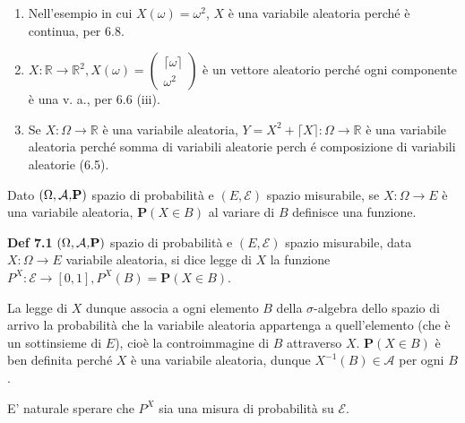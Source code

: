 \documentclass{article}
\begin{document}
\begin{enumerate}
\item Nell'esempio in cui $X\left( \omega \right) =\omega ^{2}$, $X$ \`{e}
una variabile aleatoria perch\'{e} \`{e} continua, per 6.8.

\item $X:%
\mathbb{R}
\mathcal{\rightarrow }%
\mathbb{R}
^{2},X\left( \omega \right) =\left( 
\begin{array}{c}
\lceil \omega \rceil \\ 
\omega ^{2}%
\end{array}%
\right) $ \`{e} un vettore aleatorio perch\'{e} ogni componente \`{e} una v.
a., per 6.6 (iii).

\item Se $X:\Omega \rightarrow 
\mathbb{R}
$ \`{e} una variabile aleatoria, $Y=X^{2}+\lceil X\rceil :\Omega \rightarrow 
\mathbb{R}
$ \`{e} una variabile aleatoria perch\'{e} somma di variabili aleatorie perch%
\'{e} composizione di variabili aleatorie (6.5).
\end{enumerate}

Dato $\left( \Omega ,\mathcal{A}\emph{,}\mathbf{P}\right) $ spazio di
probabilit\`{a} e $\left( E,\mathcal{E}\right) $ spazio misurabile, se $%
X:\Omega \rightarrow E$ \`{e} una variabile aleatoria, $\mathbf{P}\left(
X\in B\right) $ al variare di $B$ definisce una funzione.

\textbf{Def 7.1} $\left( \Omega ,\mathcal{A}\emph{,}\mathbf{P}\right) $
spazio di probabilit\`{a} e $\left( E,\mathcal{E}\right) $ spazio
misurabile, data $X:\Omega \rightarrow E$ variabile aleatoria, si dice legge
di $X$ la funzione $P^{X}:\mathcal{E}\rightarrow \left[ 0,1\right]
,P^{X}\left( B\right) =\mathbf{P}\left( X\in B\right) $.

La legge di $X$ dunque associa a ogni elemento $B$ della $\sigma $-algebra
dello spazio di arrivo la probabilit\`{a} che la variabile aleatoria
appartenga a quell'elemento (che \`{e} un sottinsieme di $E$), cio\`{e} la
controimmagine di $B$ attraverso $X$. $\mathbf{P}\left( X\in B\right) $ \`{e}
ben definita perch\'{e} $X$ \`{e} una variabile aleatoria, dunque $%
X^{-1}\left( B\right) \in \mathcal{A}$ per ogni $B$.

E' naturale sperare che $P^{X}$ sia una misura di probabilit\`{a} su $%
\mathcal{E}$.
\end{document}
